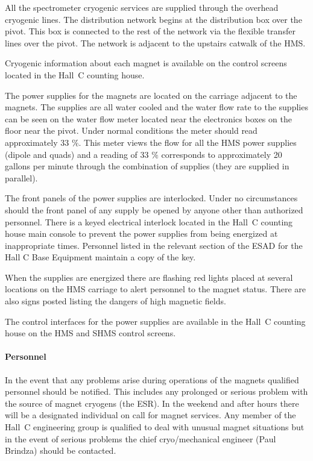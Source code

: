 {All the spectrometer cryogenic services are supplied through the overhead
cryogenic lines. The distribution network begins at the distribution
box over the pivot. This box is connected to the rest of the network via the
flexible transfer lines over the pivot. The network is adjacent to
the upstairs catwalk of the HMS.

Cryogenic information about each magnet is available on the control
screens located in the Hall~C counting house.

The power supplies for the magnets are located on the carriage
adjacent to the magnets. The supplies are all water cooled and
the water flow rate to the supplies can be seen on the water flow
meter located near the electronics boxes on the floor near the pivot.
Under normal conditions the meter should read
approximately 33 $\%$. This meter views the flow for all the HMS power supplies
(dipole and quads) and a reading of 33 $\%$ corresponds to approximately
20 gallons per minute through the combination of supplies (they are supplied
in parallel).

The front panels of the power supplies are interlocked. Under
no circumstances should the front panel of any supply be opened by anyone other
than authorized personnel. There is a keyed electrical interlock
located in the Hall~C counting house main console to prevent the
power supplies from being energized at inappropriate times.
Personnel listed in the relevant section of the ESAD for the Hall C
Base Equipment maintain a copy
of the key.

When the supplies are energized there are flashing red lights placed at
several locations on the HMS carriage to alert personnel to the magnet
status. There are also signs posted listing the dangers of high magnetic
fields.

The control interfaces for the power supplies are available in the 
Hall~C counting house on the HMS and SHMS control screens.

\paragraph{Personnel}
In the event that any problems arise during operations of the magnets
qualified personnel should be notified. This includes any prolonged
or serious problem with the source of magnet cryogens (the ESR).
In the weekend and after hours there
will be a designated individual on call for magnet services. Any member of
the Hall~C engineering group is qualified to deal with unusual magnet situations
but in the event of serious problems the chief cryo/mechanical engineer (Paul
Brindza) should be contacted.


}
